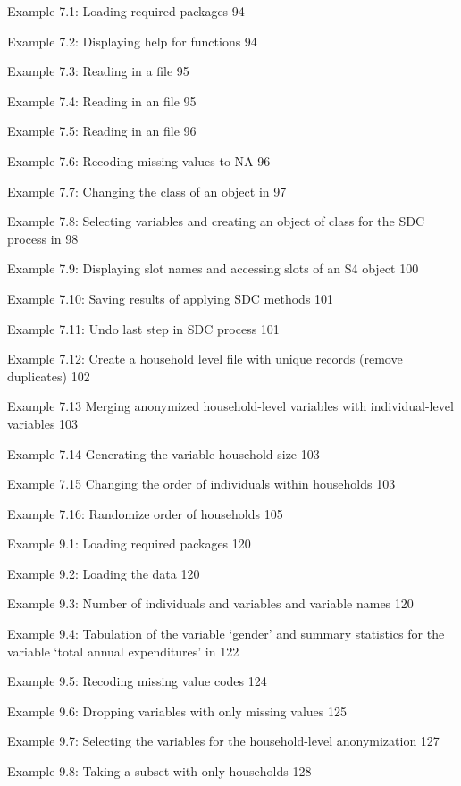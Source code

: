 \documentclass[letterpaper,10pt,english]{sphinxmanual}
\begin{document}
Example 7.1: Loading required packages 94

Example 7.2: Displaying help for functions 94

Example 7.3: Reading in a  file 95

Example 7.4: Reading in an  file 95

Example 7.5: Reading in an  file 96

Example 7.6: Recoding missing values to NA 96

Example 7.7: Changing the class of an object in  97

Example 7.8: Selecting variables and creating an object of class
 for the SDC process in  98

Example 7.9: Displaying slot names and accessing slots of an S4 object
100

Example 7.10: Saving results of applying SDC methods 101

Example 7.11: Undo last step in SDC process 101

Example 7.12: Create a household level file with unique records (remove
duplicates) 102

Example 7.13 Merging anonymized household-level variables with
individual-level variables 103

Example 7.14 Generating the variable household size 103

Example 7.15 Changing the order of individuals within households 103

Example 7.16: Randomize order of households 105

Example 9.1: Loading required packages 120

Example 9.2: Loading the data 120

Example 9.3: Number of individuals and variables and variable names 120

Example 9.4: Tabulation of the variable ‘gender’ and summary statistics
for the variable ‘total annual expenditures’ in  122

Example 9.5: Recoding missing value codes 124

Example 9.6: Dropping variables with only missing values 125

Example 9.7: Selecting the variables for the household-level
anonymization 127

Example 9.8: Taking a subset with only households 128
\end{document}
